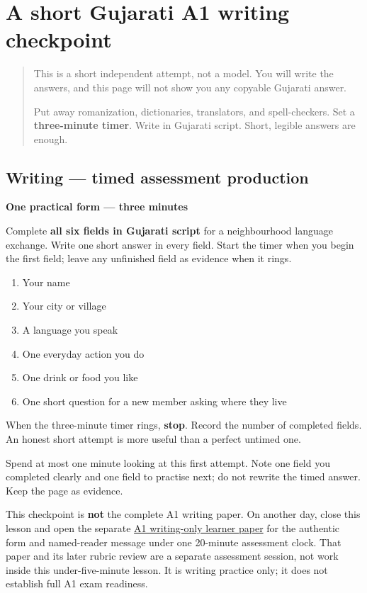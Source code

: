 \section[(short timed A1 writing checkpoint)]{A short Gujarati A1 writing checkpoint}

\label{lesson:GU-W10-a1-timed-production}



\begin{quote}
This is a short independent attempt, not a model. You will write the answers, and this page will not show you any copyable Gujarati answer.

Put away romanization, dictionaries, translators, and spell-checkers. Set a \textbf{three-minute timer}. Write in Gujarati script. Short, legible answers are enough.
\end{quote}

\subsection*{Writing — timed assessment production}
\textbf{One practical form — three minutes}

Complete \textbf{all six fields in Gujarati script} for a neighbourhood language exchange. Write one short answer in every field. Start the timer when you begin the first field; leave any unfinished field as evidence when it rings.

\begin{enumerate}
\raggedright
  \item Your name
  \item Your city or village
  \item A language you speak
  \item One everyday action you do
  \item One drink or food you like
  \item One short question for a new member asking where they live
\end{enumerate}

When the three-minute timer rings, \textbf{stop}. Record the number of completed fields. An honest short attempt is more useful than a perfect untimed one.

\begin{tcolorbox}[breakable,colback=teal!4,colframe=teal!35!black,title={Before you move on}]
Spend at most one minute looking at this first attempt. Note one field you completed clearly and one field to practise next; do not rewrite the timed answer. Keep the page as evidence.

This checkpoint is \textbf{not} the complete A1 writing paper. On another day, close this lesson and open the separate \href{https://github.com/adhithyan15/coding-adventures/blob/main/code/learning/human-languages/gujarati/mocks/a1/writing-paper-1.md}{A1 writing-only learner paper} for the authentic form and named-reader message under one 20-minute assessment clock. That paper and its later rubric review are a separate assessment session, not work inside this under-five-minute lesson. It is writing practice only; it does not establish full A1 exam readiness.
\end{tcolorbox}
